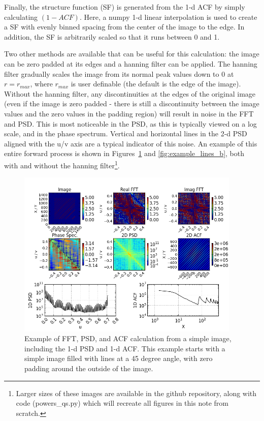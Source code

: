 \documentclass[11pt,preprint]{aastex}
\begin{document}
Finally, the structure function (SF) is generated from the 1-d ACF by simply calculating $(1 - ACF)$. Here, a numpy 1-d linear interpolation is used to create a SF with evenly binned spacing from the center of the image to the edge. In addition, the SF is arbitrarily scaled so that it runs between 0 and 1. 

Two other methods are available that can be useful for this calculation: the image can be zero padded at its edges and a hanning filter can be applied. The hanning filter gradually scales the image from its normal peak values down to 0 at $r=r_{max}$, where $r_{max}$ is user definable (the default is the edge of the image). Without the hanning filter, any discontinuities at the edges of the original image (even if the image is zero padded - there is still a discontinuity between the image values and the zero values in the padding region) will result in noise in the FFT and PSD. This is most noticeable in the PSD, as this is typically viewed on a log scale, and in the phase spectrum. Vertical and horizontal lines in the 2-d PSD aligned with the u/v axis are a typical indicator of this noise.  An example of this entire forward process is shown in Figures~\ref{fig:example_lines_a} and \ref{fig:example_lines_b}, both with and without the hanning filter\footnote{Larger sizes of these images are available in the github repository, along with code (powers\_qs.py) which will recreate all figures in this note from scratch.}.  

\begin{figure}[htbp]
\centering
\includegraphics[width=4.2in]{example_lines_a}
\caption{{\small
Example of FFT, PSD, and ACF calculation from a simple image, including the 1-d PSD and 1-d ACF.  This example starts with a simple image filled with lines at a 45 degree angle, with zero padding around the outside of the image.  }}
\label{fig:example_lines_a}
\end{figure}
\end{document}
